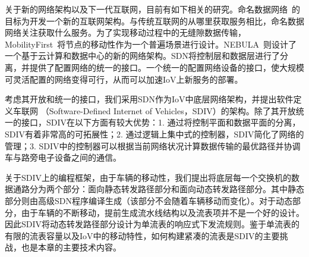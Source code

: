 关于新的网络架构以及下一代互联网，目前有如下相关的研究。命名数据网络~\cite{NDN}的目标为开发一个新的互联网架构。与传统互联网的从哪里获取服务相比，命名数据网络关注获取什么服务。为了实现移动过程中的无缝隙数据传输，MobilityFirst~\cite{MobilityFirst}将节点的移动性作为一个普遍场景进行设计。NEBULA~\cite{NEBULA}则设计了一个基于云计算和数据中心的新的网络架构。SDN将控制层和数据层进行了分离，并提供了配置网络的统一的接口。一个统一的配置网络设备的接口，使大规模可灵活配置的网络变得可行，从而可以加速IoV上新服务的部署。


考虑其开放和统一的接口，我们采用SDN作为IoV中底层网络架构，并提出软件定义车联网 （Software-Defined Internet of Vehicles，SDIV）的架构。除了其开放统一的接口，SDIV在以下方面有较大优势：1. 通过将控制平面和数据平面的分离，SDIV有着非常高的可拓展性；2. 通过逻辑上集中式的控制器，SDIV简化了网络的管理；3. SDIV中的控制器可以根据当前网络状况计算数据传输的最优路径并协调车与路旁电子设备之间的通信。

关于SDIV上的编程框架，由于车辆的移动性，我们提出将底层每一个交换机的数据通路分为两个部分：面向静态转发路径部分和面向动态转发路径部分。其中静态部分则由高级SDN程序编译生成（该部分不会随着车辆移动而变化）。对于动态部分，由于车辆的不断移动，提前生成流水线结构以及流表项并不是一个好的设计。因此SDIV将动态转发路径部分设计为单流表的响应式下发流规则。鉴于单流表的有限的流表容量以及IoV中的移动特性，如何构建紧凑的流表是SDIV的主要挑战，也是本章的主要技术内容。



